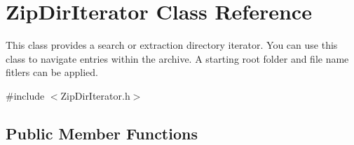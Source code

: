 \hypertarget{class_zip_dir_iterator}{}\section{Zip\+Dir\+Iterator Class Reference}
\label{class_zip_dir_iterator}


This class provides a search or extraction directory iterator. You can use this class to navigate entries within the archive. A starting root folder and file name fitlers can be applied.  




{\ttfamily \#include $<$Zip\+Dir\+Iterator.\+h$>$}

\subsection*{Public Member Functions}
